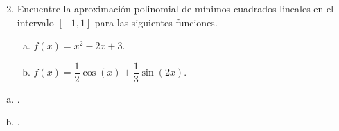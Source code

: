 \begin{frame}
	\begin{enumerate}\setcounter{enumi}{1}
		\item

		      Encuentre la aproximación polinomial de mínimos cuadrados
		      lineales en el intervalo $\left[-1,1\right]$ para las
		      siguientes funciones.

		      \begin{multicols}{2}

			      \begin{enumerate}[a)]

				      \item

				            \begin{math}
					            f\left(x\right)=
					            x^{2}-2x+3
				            \end{math}.

				      \item

				            \begin{math}
					            f\left(x\right)=
					            \dfrac{1}{2}\cos\left(x\right)+
					            \dfrac{1}{3}\sin\left(2x\right)
				            \end{math}.

			      \end{enumerate}
		      \end{multicols}
	\end{enumerate}

	\begin{solution}
		\begin{multicols}{2}
			\begin{enumerate}[a)]
				\item

				      .

				\item

				      .
			\end{enumerate}
		\end{multicols}
	\end{solution}
\end{frame}